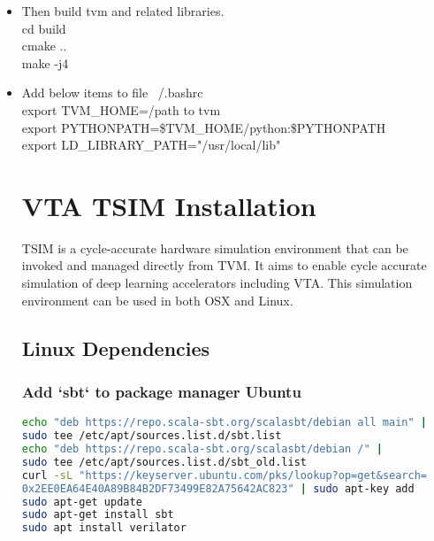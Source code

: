 \documentclass{article}
\begin{document}
\begin{itemize}
\begin{itemize}
    \end{itemize}
\item Then build tvm and related libraries.\\
    cd build\\
    cmake ..\\
    make -j4\\
\item Add below items to file ~/.bashrc\\
export TVM\_HOME=/path to tvm\\
export PYTHONPATH=\$TVM\_HOME/python:\${PYTHONPATH}\\
export LD\_LIBRARY\_PATH="/usr/local/lib"\\

\section{VTA TSIM Installation}
TSIM is a cycle-accurate hardware simulation environment that can be invoked and managed directly from TVM. It aims to enable cycle accurate simulation of deep learning accelerators including VTA. This simulation environment can be used in both OSX and Linux.\\
\subsection{Linux Dependencies}
\subsubsection{Add `sbt` to package manager Ubuntu}
\begin{lstlisting}[language=bash]
echo "deb https://repo.scala-sbt.org/scalasbt/debian all main" | 
sudo tee /etc/apt/sources.list.d/sbt.list
echo "deb https://repo.scala-sbt.org/scalasbt/debian /" | 
sudo tee /etc/apt/sources.list.d/sbt_old.list
curl -sL "https://keyserver.ubuntu.com/pks/lookup?op=get&search=
0x2EE0EA64E40A89B84B2DF73499E82A75642AC823" | sudo apt-key add
sudo apt-get update
sudo apt-get install sbt
sudo apt install verilator
\end{lstlisting}

\end{itemize}
\end{document}
